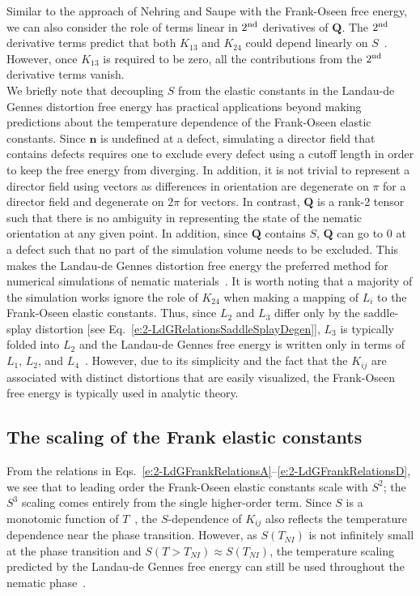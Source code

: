 Similar to the approach of Nehring and Saupe with the Frank-Oseen free energy, we can also consider the role of terms linear in $2^{\rm nd}$ derivatives of $\mathbf{Q}$.
The $2^{\rm nd}$ derivative terms predict that both $K_{13}$ and $K_{24}$ could depend linearly on $S$~\cite{RN58}.
However, once $K_{13}$ is required to be zero, all the contributions from the $2^{\rm nd}$ derivative terms vanish.\\


We briefly note that decoupling $S$ from the elastic constants in the Landau-de Gennes distortion free energy has practical applications beyond making predictions about the temperature dependence of the Frank-Oseen elastic constants.
Since $\mathbf{n}$ is undefined at a defect, simulating a director field that contains defects requires one to exclude every defect using a cutoff length in order to keep the free energy from diverging.
In addition, it is not trivial to represent a director field using vectors as differences in orientation are degenerate on $\pi$ for a director field and degenerate on $2\pi$ for vectors.
In contrast, $\mathbf{Q}$ is a rank-2 tensor such that there is no ambiguity in representing the state of the nematic orientation at any given point.
In addition, since $\mathbf{Q}$ contains $S$, $\mathbf{Q}$ can go to 0 at a defect such that no part of the simulation volume needs to be excluded.
This makes the Landau-de Gennes distortion free energy the preferred method for numerical simulations of nematic materials~\cite{RN190}.
It is worth noting that a majority of the simulation works ignore the role of $K_{24}$ when making a mapping of $L_i$ to the Frank-Oseen elastic constants.
Thus, since $L_2$ and $L_3$ differ only by the saddle-splay distortion [see Eq.~\ref{e:2-LdGRelationsSaddleSplayDegen}], $L_3$ is typically folded into $L_2$ and the Landau-de Gennes free energy is written only in terms of $L_1$, $L_2$, and $L_4$~\cite{RN198,RN190}.
However, due to its simplicity and the fact that the $K_{ij}$ are associated with distinct distortions that are easily visualized, the Frank-Oseen free energy is typically used in analytic theory.\\


\subsection{The scaling of the Frank elastic constants}
From the relations in Eqs.~\ref{e:2-LdGFrankRelationsA}--\ref{e:2-LdGFrankRelationsD}, we see that to leading order the Frank-Oseen elastic constants scale with $S^2$; the $S^3$ scaling comes entirely from the single higher-order term.
Since $S$ is a monotomic function of $T$~\cite{RN33}, the $S$-dependence of $K_{ij}$ also reflects the temperature dependence near the phase transition.
However, as $S(T_{NI})$ is not infinitely small at the phase transition and $S(T > T_{NI}) \approx S(T_{NI})$, the temperature scaling predicted by the Landau-de Gennes free energy can still be used throughout the nematic phase~\cite{RN198}.

